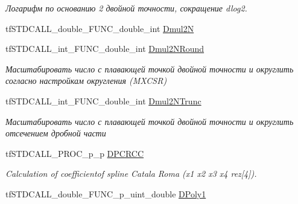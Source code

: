 \begin{DoxyCompactItemize}
\begin{DoxyCompactList}\small\item\em Логарифм по основанию 2 двойной точности, сокращение dlog2. \end{DoxyCompactList}\item 
tf\-S\-T\-D\-C\-A\-L\-L\-\_\-double\-\_\-\-F\-U\-N\-C\-\_\-double\-\_\-int \hyperlink{structs_functions_math_c_p_u_a2c3dcbd12ba59ec2099fc0bc44422301}{Dmul2\-N}
\item 
\hypertarget{structs_functions_math_c_p_u_a092b0a52e5529a9b33dfab3af79247e2}{tf\-S\-T\-D\-C\-A\-L\-L\-\_\-int\-\_\-\-F\-U\-N\-C\-\_\-double\-\_\-int \hyperlink{structs_functions_math_c_p_u_a092b0a52e5529a9b33dfab3af79247e2}{Dmul2\-N\-Round}}\label{structs_functions_math_c_p_u_a092b0a52e5529a9b33dfab3af79247e2}

\begin{DoxyCompactList}\small\item\em Масштабировать число с плавающей точкой двойной точности и округлить согласно настройкам округления (M\-X\-C\-S\-R) \end{DoxyCompactList}\item 
\hypertarget{structs_functions_math_c_p_u_a5cf0ce758e973178431e04a25edfd62a}{tf\-S\-T\-D\-C\-A\-L\-L\-\_\-int\-\_\-\-F\-U\-N\-C\-\_\-double\-\_\-int \hyperlink{structs_functions_math_c_p_u_a5cf0ce758e973178431e04a25edfd62a}{Dmul2\-N\-Trunc}}\label{structs_functions_math_c_p_u_a5cf0ce758e973178431e04a25edfd62a}

\begin{DoxyCompactList}\small\item\em Масштабировать число с плавающей точкой двойной точности и округлить отсечением дробной части \end{DoxyCompactList}\item 
\hypertarget{structs_functions_math_c_p_u_ac49fcd55a45293d0b2f4fc90937c866e}{tf\-S\-T\-D\-C\-A\-L\-L\-\_\-\-P\-R\-O\-C\-\_\-p\-\_\-p \hyperlink{structs_functions_math_c_p_u_ac49fcd55a45293d0b2f4fc90937c866e}{D\-P\-C\-R\-C\-C}}\label{structs_functions_math_c_p_u_ac49fcd55a45293d0b2f4fc90937c866e}

\begin{DoxyCompactList}\small\item\em Calculation of coefficientof spline Catala Roma (x1 x2 x3 x4 rez\mbox{[}4\mbox{]}). \end{DoxyCompactList}\item 
\hypertarget{structs_functions_math_c_p_u_abd810788dd6cffd622243ac0cec698f8}{tf\-S\-T\-D\-C\-A\-L\-L\-\_\-double\-\_\-\-F\-U\-N\-C\-\_\-p\-\_\-uint\-\_\-double \hyperlink{structs_functions_math_c_p_u_abd810788dd6cffd622243ac0cec698f8}{D\-Poly1}}\label{structs_functions_math_c_p_u_abd810788dd6cffd622243ac0cec698f8}


\end{DoxyCompactItemize}
